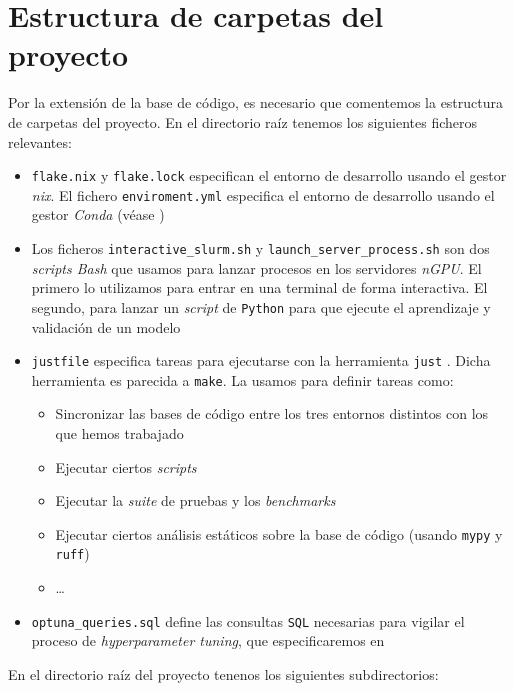 \section{Estructura de carpetas del proyecto} \label{isec:estructura_carpetas}

Por la extensión de la base de código, es necesario que comentemos la estructura de carpetas del proyecto. En el directorio raíz tenemos los siguientes ficheros relevantes:

\begin{itemize}
    \item \lstinline{flake.nix} y \lstinline{flake.lock} especifican el entorno de desarrollo usando el gestor \textit{nix}. El fichero \lstinline{enviroment.yml} especifica el entorno de desarrollo usando el gestor \textit{Conda} (véase )
    \item Los ficheros \lstinline{interactive_slurm.sh} y \lstinline{launch_server_process.sh} son dos \textit{scripts Bash} que usamos para lanzar procesos en los servidores \textit{nGPU}. El primero lo utilizamos para entrar en una terminal de forma interactiva. El segundo, para lanzar un \textit{script} de \lstinline{Python} para que ejecute el aprendizaje y validación de un modelo
    \item \lstinline{justfile} especifica tareas para ejecutarse con la herramienta \lstinline{just} \cite{informatica:just}. Dicha herramienta es parecida a \lstinline{make}. La usamos para definir tareas como:
        \begin{itemize}
            \item Sincronizar las bases de código entre los tres entornos distintos con los que hemos trabajado
            \item Ejecutar ciertos \textit{scripts}
            \item Ejecutar la \textit{suite} de pruebas y los \textit{benchmarks}
            \item Ejecutar ciertos análisis estáticos sobre la base de código (usando \lstinline{mypy} y \lstinline{ruff})
            \item \ldots
        \end{itemize}
    \item \lstinline{optuna_queries.sql} define las consultas \lstinline{SQL} necesarias para vigilar el proceso de \textit{hyperparameter tuning}, que especificaremos en 
\end{itemize}

En el directorio raíz del proyecto tenenos los siguientes subdirectorios:


